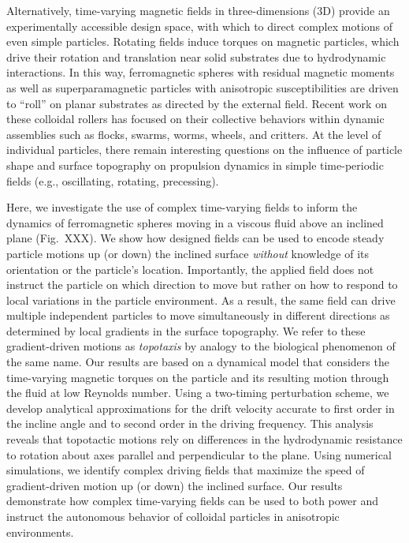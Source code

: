 Alternatively, time-varying magnetic fields in three-dimensions (3D) provide an experimentally accessible design space, with which to direct complex motions of even simple particles. Rotating fields induce torques on magnetic particles,\autocite{janssen2009controlled} which drive their rotation and translation near solid substrates due to hydrodynamic interactions.\autocite{Swan2007} In this way, ferromagnetic spheres with residual magnetic moments\autocite{Driscoll2017} as well as superparamagnetic particles with anisotropic susceptibilities\autocite{tierno2008controlled} are driven to “roll” on planar substrates as directed by the external field. Recent work on these colloidal rollers has focused on their collective behaviors within dynamic assemblies such as flocks,\autocite{kaiser2017flocking} swarms,\autocite{xie2019reconfigurable} worms,\autocite{Martinez-Pedrero2015} wheels,\autocite{tasci2016surface} and critters.\autocite{Driscoll2017} At the level of individual particles, there remain interesting questions on the influence of particle shape\autocite{zhang2010controlled} and surface topography\autocite{yang2019microwheels} on propulsion dynamics in simple time-periodic fields (e.g., oscillating, rotating, precessing).
 
Here, we investigate the use of complex time-varying fields to inform the dynamics of ferromagnetic spheres moving in a viscous fluid above an inclined plane (Fig.~XXX). We show how designed fields can be used to encode steady particle motions up (or down) the inclined surface \emph{without} knowledge of its orientation or the particle’s location. Importantly, the applied field does not instruct the particle on which direction to move but rather on how to respond to local variations in the particle environment. As a result, the same field can drive multiple independent particles to move simultaneously in different directions as determined by local gradients in the surface topography.  We refer to these gradient-driven motions as \emph{topotaxis} by analogy to the biological phenomenon of the same name.\autocite{park2018topotaxis} Our results are based on a dynamical model that considers the time-varying magnetic torques on the particle and its resulting motion through the fluid at low Reynolds number. Using a two-timing perturbation scheme, we develop analytical approximations for the drift velocity accurate to first order in the incline angle and to second order in the driving frequency.   This analysis reveals that topotactic motions rely on differences in the hydrodynamic resistance to rotation about axes parallel and perpendicular to the plane. Using numerical simulations, we identify complex driving fields that maximize the speed of gradient-driven motion up (or down) the inclined surface.  Our results demonstrate how complex time-varying fields can be used to both power and instruct the autonomous behavior of colloidal particles in anisotropic environments.





